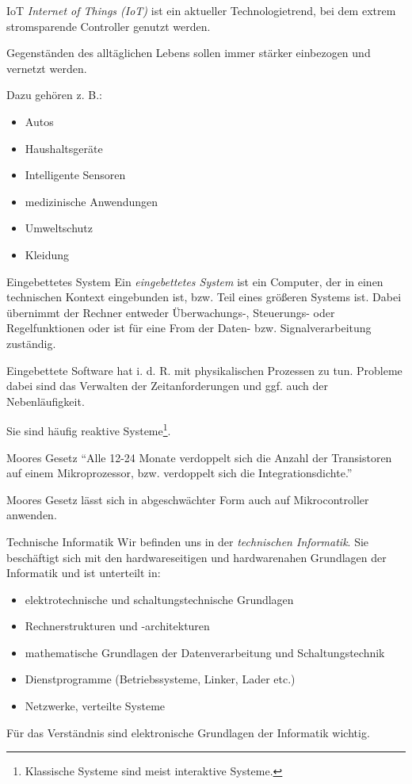 \begin{defi}{IoT}
    \emph{Internet of Things (IoT)} ist ein aktueller Technologietrend, bei dem extrem stromsparende Controller genutzt werden.

    Gegenständen des alltäglichen Lebens sollen immer stärker einbezogen und vernetzt werden.

    Dazu gehören z. B.:
    \begin{itemize}
        \item Autos
        \item Haushaltsgeräte
        \item Intelligente Sensoren
        \item medizinische Anwendungen
        \item Umweltschutz
        \item Kleidung
    \end{itemize}
\end{defi}

\begin{defi}{Eingebettetes System}
    Ein \emph{eingebettetes System} ist ein Computer, der in einen technischen Kontext eingebunden ist, bzw. Teil eines größeren Systems ist.
    Dabei übernimmt der Rechner entweder Überwachungs-, Steuerungs- oder Regelfunktionen oder ist für eine From der Daten- bzw. Signalverarbeitung zuständig.

    Eingebettete Software hat i. d. R. mit physikalischen Prozessen zu tun.
    Probleme dabei sind das Verwalten der Zeitanforderungen und ggf. auch der Nebenläufigkeit.

    Sie sind häufig reaktive Systeme\footnote{Klassische Systeme sind meist interaktive Systeme.}.
\end{defi}

\begin{bonus}{Moores Gesetz}
    \enquote{Alle 12-24 Monate verdoppelt sich die Anzahl der Transistoren auf einem Mikroprozessor, bzw. verdoppelt sich die Integrationsdichte.}

    Moores Gesetz lässt sich in abgeschwächter Form auch auf Mikrocontroller anwenden.
\end{bonus}

\begin{defi}{Technische Informatik}
    Wir befinden uns in der \emph{technischen Informatik}.
    Sie beschäftigt sich mit den hardwareseitigen und hardwarenahen Grundlagen der Informatik und ist unterteilt in:
    \begin{itemize}
        \item elektrotechnische und schaltungstechnische Grundlagen
        \item Rechnerstrukturen und -architekturen
        \item mathematische Grundlagen der Datenverarbeitung und Schaltungstechnik
        \item Dienstprogramme (Betriebssysteme, Linker, Lader etc.)
        \item Netzwerke, verteilte Systeme
    \end{itemize}

    Für das Verständnis sind elektronische Grundlagen der Informatik wichtig.
\end{defi}

